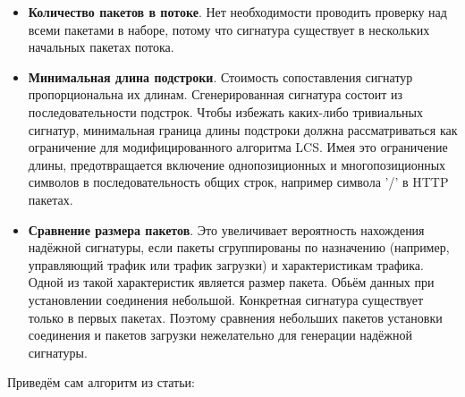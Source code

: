 \begin{itemize}
    \item \textbf{Количество пакетов в потоке}.
    Нет необходимости проводить проверку над всеми пакетами в наборе,
    потому что сигнатура существует в нескольких начальных пакетах потока.
    \item \textbf{Минимальная длина подстроки}. Стоимость сопоставления сигнатур пропорциональна их длинам.
    Сгенерированная сигнатура состоит из последовательности подстрок.
    Чтобы избежать каких-либо тривиальных сигнатур,
    минимальная граница длины подстроки должна рассматриваться как ограничение для модифицированного алгоритма LCS.
    Имея это ограничение длины, предотвращается включение однопозиционных и многопозиционных символов в последовательность общих строк,
    например символа '/' в HTTP пакетах.
    \item \textbf{Сравнение размера пакетов}. Это увеличивает вероятность нахождения надёжной сигнатуры,
    если пакеты сгруппированы по назначению (например, управляющий трафик или трафик загрузки) и характеристикам трафика.
    Одной из такой характеристик является размер пакета. Обьём данных при установлении соединения небольшой.
    Конкретная сигнатура существует только в первых пакетах.
    Поэтому сравнения небольших пакетов установки соединения и пакетов загрузки нежелательно для генерации надёжной сигнатуры.

\end{itemize}

Приведём сам алгоритм из статьи:

